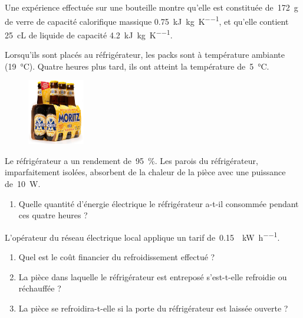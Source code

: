 	Une expérience effectuée sur une bouteille montre qu’elle est constituée de~\SI{172}{\gram} de verre de capacité calorifique massique \SI{0,75}{\kilo\joule\per\kilogram\per\kelvin}, et qu’elle contient \SI{25}{\centi\liter} de liquide de capacité \SI{4,2}{\kilo\joule\per\kilogram\per\kelvin}.
	
	Lorsqu’ils sont placés au réfrigérateur, les packs sont à température ambiante (\SI{19}{\degreeCelsius}). Quatre heures plus tard, ils ont atteint la température de~\SI{5}{\degreeCelsius}.
	
	\begin{figure}[htp] %
		\begin{center}
		\onlyframabook{\vspace{-0.3cm}}%
		\includegraphics[width=2.5cm]{images/6-pack.jpg}
		\onlyframabook{\\\vspace{-0.6cm}}%
		\end{center}
		\label{fig_six_pack}
	\end{figure}
	
	Le réfrigérateur a un rendement de~\SI{95}{\percent}. Les parois du réfrigérateur, imparfaitement isolées, absorbent de la chaleur de la pièce avec une puissance de~\SI{10}{\watt}.

	
	\begin{enumerate}
		\item Quelle quantité d’énergie électrique le réfrigérateur a-t-il consommée pendant ces quatre heures ?
	\end{enumerate}
	
	L’opérateur du réseau électrique local applique un tarif de~\SI[per-mode=symbol]{0,15}{\euroo\per\kilo\watt\per\hour}.
	
	\begin{enumerate}
		\item Quel est le coût financier du refroidissement effectué ?
		\item La pièce dans laquelle le réfrigérateur est entreposé s’est-t-elle refroidie ou réchauffée ?
		\item La pièce se refroidira-t-elle si la porte du réfrigérateur est laissée ouverte ?
	\end{enumerate}


